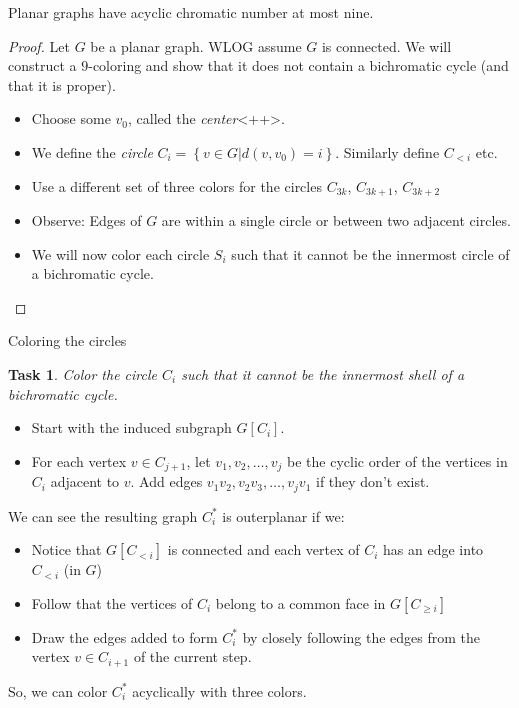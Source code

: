 \documentclass[t]{beamer}
\newtheorem{task}{Task}
\begin{document}
\begin{frame}
    \begin{theorem}
	Planar graphs have acyclic chromatic number at most nine.
    \end{theorem}
    \pause
    \begin{proof}
	Let $G$ be a planar graph. \pause WLOG assume $G$ is connected. \pause We will construct a $9$-coloring and show that it does not contain a bichromatic cycle \pause (and that it is proper).
	\begin{itemize}
		\pause
	    \item Choose some $v_0$, called the \textit{center}<++>.
		\pause
	    \item We define the \emph{circle} $C_i = \left\{v \in G | d(v, v_0)=i\right\}$. Similarly define $C_{<i}$ etc.
		\pause
	    \item Use a different set of three colors for the circles $C_{3k}$, $C_{3k+1}$, $C_{3k+2}$
		\pause
	    \item Observe: Edges of $G$ are within a single circle or between two adjacent circles.
		\pause
	    \item We will now color each circle $S_i$ such that it cannot be the innermost circle of a bichromatic cycle.
	\end{itemize}
	\phantom\qedhere
    \end{proof}
\end{frame}

\begin{frame}{Coloring the circles}
    \begin{task}
	Color the circle $C_i$ such that it cannot be the innermost shell of a bichromatic cycle.
    \end{task}
    \pause
    \begin{itemize}
	\item Start with the induced subgraph $G[C_i]$. 
		\pause
	\item For each vertex $v \in C_{j+1}$, let $v_1, v_2, \dots, v_j$ be the cyclic order of the vertices in $C_i$ adjacent to $v$. Add edges $v_1v_2, v_2v_3, \dots, v_jv_1$ if they don't exist. 
		\pause
    \end{itemize}
    We can see the resulting graph $C_i^*$ is outerplanar if we:
		\pause
    \begin{itemize}
	\item Notice that $G[C_{<i}]$ is connected and each vertex of $C_i$ has an edge into $C_{<i}$ (in $G$)
		\pause
	\item Follow that the vertices of $C_i$ belong to a common face in $G[C_{\ge i}]$
		\pause
	\item Draw the edges added to form $C_i^*$ by closely following the edges from the vertex $v \in C_{i+1}$ of the current step.
		\pause
    \end{itemize}
    So, we can color $C_i^*$ acyclically with three colors.
\end{frame}
\end{document}
